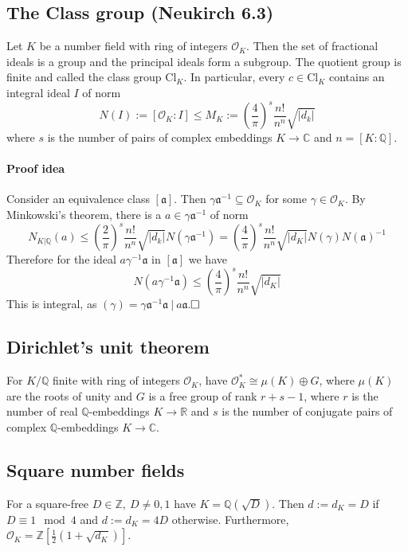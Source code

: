 \documentclass{scrartcl}
\newcommand{\R}{\mathbb{R}}
\newcommand{\Z}{\mathbb{Z}}
\newcommand{\Q}{\mathbb{Q}}
\newcommand{\C}{\mathbb{C}}
\begin{document}
\subsection{The Class group (Neukirch 6.3)}
Let $K$ be a number field with ring of integers $\mathcal{O}_K$. Then the set of fractional ideals is a group and the principal ideals form a subgroup. The quotient group is finite and called the class group $\mathrm{Cl}_K$. In particular, every $c \in \mathrm{Cl}_K$ contains an integral ideal $I$ of norm
\begin{equation*}
    N(I) := [ \mathcal{O}_K : I ] \leq M_K := \left( \frac 4 \pi \right)^s \frac {n!} {n^n} \sqrt{|d_k|}
\end{equation*}
where $s$ is the number of pairs of complex embeddings $K \to \mathbb{C}$ and $n = [K : \Q]$.
\paragraph{Proof idea} Consider an equivalence class $[\mathfrak{a}]$. Then $\gamma \mathfrak{a}^{-1} \subseteq \mathcal{O}_K$ for some $\gamma \in \mathcal{O}_K$.
By Minkowski's theorem, there is a $a \in \gamma\mathfrak{a}^{-1}$ of norm
\begin{equation*}
    N_{K|\Q}(a) \leq \left(\frac 2 \pi\right)^s \frac {n!} {n^n} \sqrt{|d_k|} N(\gamma\mathfrak{a}^{-1}) = \left(\frac 4 \pi\right)^s \frac {n!} {n^n} \sqrt{|d_K|} N(\gamma) N(\mathfrak{a})^{-1}
\end{equation*}
Therefore for the ideal $a\gamma^{-1}\mathfrak{a}$ in $[\mathfrak{a}]$ we have
\begin{equation*}
    N(a\gamma^{-1}\mathfrak{a}) \leq \left(\frac 4 \pi\right)^s \frac {n!} {n^n} \sqrt{|d_K|}
\end{equation*}
This is integral, as $(\gamma) = \gamma\mathfrak{a}^{-1}\mathfrak{a} \ | \ a\mathfrak{a}$.$\hfill\square$

\subsection{Dirichlet's unit theorem}
For $K / \Q$ finite with ring of integers $\mathcal{O}_K$, have $\mathcal{O}_K^* \cong \mu(K) \oplus G$, where $\mu(K)$ are the roots of unity and $G$ is a free group of rank $r + s - 1$, where $r$ is the number of real $\Q$-embeddings $K \to \R$ and $s$ is the number of conjugate pairs of complex $\Q$-embeddings $K \to \C$.

\subsection{Square number fields}
For a square-free $D \in \Z, \ D \neq 0, 1$ have $K = \Q(\sqrt{D})$. Then $d := d_K = D$ if $D \equiv 1 \mod 4$ and $d := d_K = 4D$ otherwise. Furthermore, $\mathcal{O}_K = \Z[\frac 1 2 (1 + \sqrt{d_K})]$.
\end{document}
